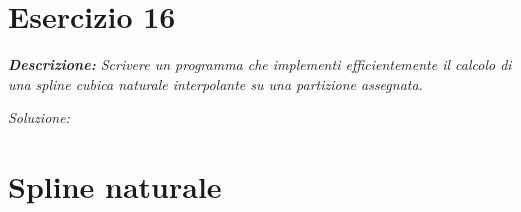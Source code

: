\section{Esercizio 16}
\textit{\textbf{Descrizione:} Scrivere un programma che implementi efficientemente il calcolo di una spline cubica naturale interpolante su una partizione assegnata.}\newline

\noindent\emph{Soluzione: }\newline

\section*{Spline naturale}

\newpage


\newpage